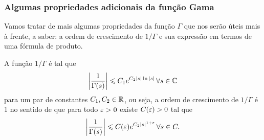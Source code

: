     
    \subsubsection*{Algumas propriedades adicionais da função Gama}
    Vamos tratar de mais algumas propriedades da função $\Gamma$ que nos
    serão úteis mais à frente, a saber: a ordem de crescimento de $1/\Gamma$
    e sua expressão em termos de uma fórmula de produto.
    \begin{teorema}
    \label{teo-ordem-cresc-inv-gama}
        A função $1/\Gamma$ é tal que
        \[
        \left| \frac{1}{\Gamma(s)} \right| \leqslant C_1e^{C_2|s|\ln|s|} \, \forall s\in \mathbb{C}
        \]
        para um par de constantes $C_1,C_2\in\mathbb{R}$,
        ou seja, a ordem de crescimento de $1/\Gamma$ é 1 no sentido de que
        para todo $\varepsilon>0$ existe $C(\varepsilon)>0$ tal que
        \[
        \left| \frac{1}{\Gamma(s)} \right| \leqslant C(\varepsilon)e^{C_2|s|^{1+\varepsilon}} \, \forall s\in C.
        \]
    \end{teorema}
